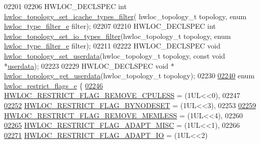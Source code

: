 \begin{DoxyCode}
02201 
02206 HWLOC\_DECLSPEC \textcolor{keywordtype}{int} \hyperlink{a00193_ga37c7b2e599ed3cd76ad9164630024f30}{hwloc\_topology\_set\_icache\_types\_filter}(
      hwloc\_topology\_t topology, \textcolor{keyword}{enum} \hyperlink{a00193_ga9a5a1f0140cd1952544477833733195b}{hwloc\_type\_filter\_e} filter);
02207 
02210 HWLOC\_DECLSPEC \textcolor{keywordtype}{int} \hyperlink{a00193_ga0ab38705357bc1203abe829da8a12ad3}{hwloc\_topology\_set\_io\_types\_filter}(hwloc\_topology\_t 
      topology, \textcolor{keyword}{enum} \hyperlink{a00193_ga9a5a1f0140cd1952544477833733195b}{hwloc\_type\_filter\_e} filter);
02211 
02222 HWLOC\_DECLSPEC \textcolor{keywordtype}{void} \hyperlink{a00193_ga2cc7b7b155cba58dda203e54f1637b9c}{hwloc\_topology\_set\_userdata}(hwloc\_topology\_t topology, \textcolor{keyword}{const}
       \textcolor{keywordtype}{void} *\hyperlink{a00238_a76fd3ac94401cf32dfccc3a3a8de68a5}{userdata});
02223 
02229 HWLOC\_DECLSPEC \textcolor{keywordtype}{void} * \hyperlink{a00193_ga91f992f8d6c4905b2d3c4f43e509c2a3}{hwloc\_topology\_get\_userdata}(hwloc\_topology\_t topology);
02230 
\hyperlink{a00194_ga9d80f08eb25b7ac22f1b998dc8bf521f}{02240} \textcolor{keyword}{enum} \hyperlink{a00194_ga9d80f08eb25b7ac22f1b998dc8bf521f}{hwloc\_restrict\_flags\_e} \{
\hyperlink{a00194_gga9d80f08eb25b7ac22f1b998dc8bf521fa80eeb9cbba401ab050f8fb4573725891}{02246}   \hyperlink{a00194_gga9d80f08eb25b7ac22f1b998dc8bf521fa80eeb9cbba401ab050f8fb4573725891}{HWLOC\_RESTRICT\_FLAG\_REMOVE\_CPULESS} = (1UL<<0),
02247 
\hyperlink{a00194_gga9d80f08eb25b7ac22f1b998dc8bf521fae4c5b1b87232f2d8a60559e77ac65a68}{02252}   \hyperlink{a00194_gga9d80f08eb25b7ac22f1b998dc8bf521fae4c5b1b87232f2d8a60559e77ac65a68}{HWLOC\_RESTRICT\_FLAG\_BYNODESET} =  (1UL<<3),
02253 
\hyperlink{a00194_gga9d80f08eb25b7ac22f1b998dc8bf521faf5ba49808855704bfe9cb9fe7347f93b}{02259}   \hyperlink{a00194_gga9d80f08eb25b7ac22f1b998dc8bf521faf5ba49808855704bfe9cb9fe7347f93b}{HWLOC\_RESTRICT\_FLAG\_REMOVE\_MEMLESS} = (1UL<<4),
02260 
\hyperlink{a00194_gga9d80f08eb25b7ac22f1b998dc8bf521fa699969227a09bbc1a7de51dc9fb7be4b}{02265}   \hyperlink{a00194_gga9d80f08eb25b7ac22f1b998dc8bf521fa699969227a09bbc1a7de51dc9fb7be4b}{HWLOC\_RESTRICT\_FLAG\_ADAPT\_MISC} = (1UL<<1),
02266 
\hyperlink{a00194_gga9d80f08eb25b7ac22f1b998dc8bf521faa95d6985e36ec1e55f68b210297a85cb}{02271}   \hyperlink{a00194_gga9d80f08eb25b7ac22f1b998dc8bf521faa95d6985e36ec1e55f68b210297a85cb}{HWLOC\_RESTRICT\_FLAG\_ADAPT\_IO} = (1UL<<2)

\end{DoxyCode}
